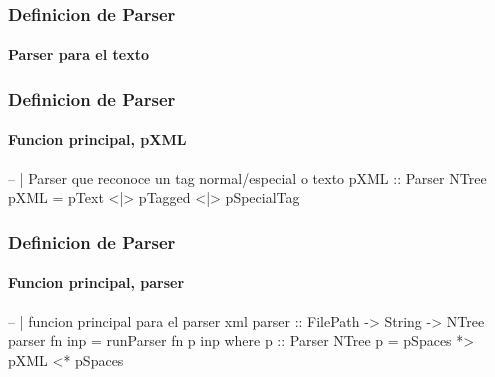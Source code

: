 \documentclass[12pt]{beamer}
\begin{document}
\begin{frame}[fragile]
\frametitle{Definicion de Parser}
\framesubtitle{Parser para el texto}
\begin{block}{}
\end{block}
\end{frame}

\begin{frame}[fragile]
\frametitle{Definicion de Parser}
\framesubtitle{Funcion principal, pXML}

\begin{block}{}
\begin{hs}
-- | Parser que reconoce un tag normal/especial o texto
pXML :: Parser NTree
pXML = pText <|> pTagged <|> pSpecialTag
\end{hs}
\end{block}
\end{frame}

\begin{frame}[fragile]
\frametitle{Definicion de Parser}
\framesubtitle{Funcion principal, parser}

\begin{block}{}
\begin{hs}
-- | funcion principal para el parser xml
parser :: FilePath -> String -> NTree
parser fn inp = runParser fn p inp
    where p :: Parser NTree
          p = pSpaces *> pXML <* pSpaces
\end{hs}
\end{block}
\end{frame}


\end{document}
